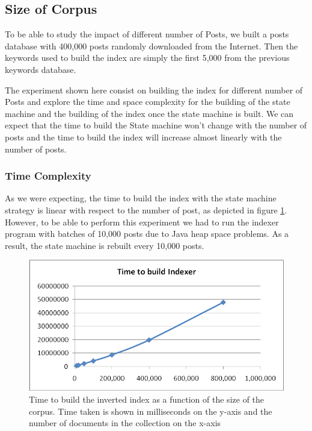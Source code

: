 \documentclass[10pt]{report}
\begin{document}
\subsection{Size of Corpus}
To be able to study the impact of different number of Posts, we built
a posts database with 400,000 posts randomly downloaded from
the Internet. Then the keywords used to build the index are simply the
first 5,000 from the previous keywords database. 

The experiment shown here consist on building the index for different
number of Posts and explore the time and space complexity for the
building of the state machine and the building of the index once the
state machine is built. We can expect that the time to build the State
machine won’t change with the number of posts and the time to build
the index will increase almost linearly with the number of posts.  


\subsubsection{Time Complexity}
As we were expecting, the time to build the index with the state
machine strategy is linear with respect to the number of post, as
depicted in figure \ref{fig:corpsizetimecomplexbuildindex}. However, to be able
to perform this experiment we had to run the indexer program with
batches of 10,000 posts due to Java heap space problems. As a result, the state
machine is rebuilt every 10,000 posts.  

\begin{figure}[h!]
  \begin{center}
    \includegraphics[width=\textwidth,height=!]{corpsizetimecomplexbuildindex}
  \end{center}
    \caption{Time to build the inverted index as a function of the
      size of the corpus. Time taken is shown in milliseconds on the
      y-axis and the number of documents in the collection on the
      x-axis} 
    \label{fig:corpsizetimecomplexbuildindex}
\end{figure} 
\end{document}
